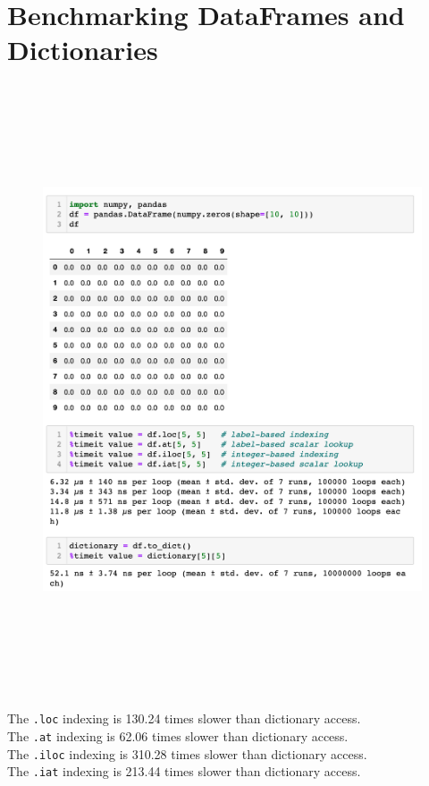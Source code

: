 \section{Benchmarking DataFrames and Dictionaries}
\label{benchmarkDF}
		 \begin{figure}[h!]
	\centering
	\includegraphics[height=18cm]{Bilder/appendix/dfvsdict.png}
	\label{fig:dbscan-plot}
\end{figure}
The \lstinline|.loc| indexing is  130.24 times slower than dictionary access.\\
The \lstinline|.at|  indexing is  62.06 times slower than dictionary access.\\
The \lstinline|.iloc|  indexing is  310.28 times slower than dictionary access.\\
The \lstinline|.iat|  indexing is  213.44 times slower than dictionary access.






